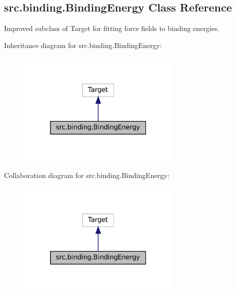 \hypertarget{classsrc_1_1binding_1_1BindingEnergy}{}\subsection{src.\+binding.\+Binding\+Energy Class Reference}
\label{classsrc_1_1binding_1_1BindingEnergy}


Improved subclass of Target for fitting force fields to binding energies.  




Inheritance diagram for src.\+binding.\+Binding\+Energy\+:
\nopagebreak
\begin{figure}[H]
\begin{center}
\leavevmode
\includegraphics[width=223pt]{classsrc_1_1binding_1_1BindingEnergy__inherit__graph}
\end{center}
\end{figure}


Collaboration diagram for src.\+binding.\+Binding\+Energy\+:
\nopagebreak
\begin{figure}[H]
\begin{center}
\leavevmode
\includegraphics[width=223pt]{classsrc_1_1binding_1_1BindingEnergy__coll__graph}
\end{center}
\end{figure}
